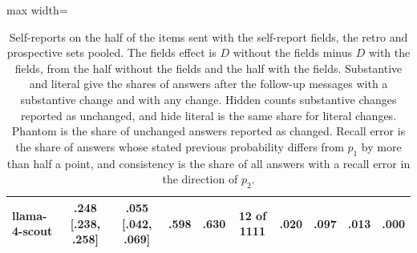 \begin{table}[t]
\begin{adjustbox}{max width=\linewidth}
\begin{tabular}{lccccccccc}
llama-4-scout & .248 [.238, .258] & .055 [.042, .069] & .598 & .630 & 12 of 1111 & .020 & .097 & .013 & .000 \\
\bottomrule
\end{tabular}
\end{adjustbox}
\caption{Self-reports on the half of the items sent with the self-report fields, the retro and prospective sets pooled. The fields effect is $D$ without the fields minus $D$ with the fields, from the half without the fields and the half with the fields. Substantive and literal give the shares of answers after the follow-up messages with a substantive change and with any change. Hidden counts substantive changes reported as unchanged, and hide literal is the same share for literal changes. Phantom is the share of unchanged answers reported as changed. Recall error is the share of answers whose stated previous probability differs from $p_1$ by more than half a point, and consistency is the share of all answers with a recall error in the direction of $p_2$.}
\label{tab:selfreport}
\end{table}

